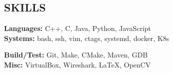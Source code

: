 \documentclass[10pt, center]{res} %
\newcommand{\skill}[2]{
	{\bf #1}
	\begin{itemize}[noitemsep,leftmargin=*]
		#2
	\end{itemize}
	\vspace{-6pt}
}
\newcommand{\SkillType}[1]{ {\bfseries \normalsize #1} }
\begin{document}
\begin{resume}
\section{SKILLS}
\vspace{0pt}
\begin{multicols}{2}
	\SkillType{Languages:} C++, C, Java, Python, JavaScript \\
	\SkillType{Systems:} bash, ssh, vim, ctags, systemd, docker, K8s \\
	
	\columnbreak
	
	\SkillType{Build/Test:} Git, Make, CMake, Maven, GDB \\
	\SkillType{Misc:} VirtualBox, Wireshark, LaTeX, OpenCV \\
\end{multicols}

%
%
%
%

\end{resume}
\end{document}
